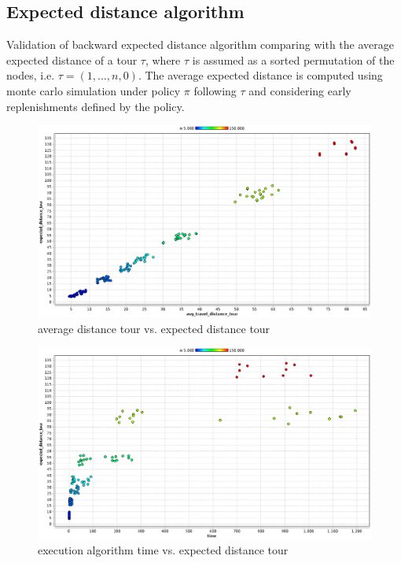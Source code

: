 \subsection{Expected distance algorithm}\label{sec:test_expecteddistance}

Validation of backward expected distance algorithm comparing with the average expected distance of a tour $\tau$, where $\tau$ is assumed as a sorted permutation of the nodes, i.e. $\tau = (1,\ldots,n,0)$. The average expected distance is computed using monte carlo simulation under policy $\pi$ following $\tau$ and considering early replenishments defined by the policy.

\begin{figure}[!htbp]
  \begin{center}
   \includegraphics[width=1\textwidth]{Images/Chapter5/avg_vs_expected_distance_tour.eps}
  \end{center}
    \caption{average distance tour vs. expected distance tour}\label{fig:avg_distance_vs_expected_distance_tour}
\end{figure}

\begin{figure}[!htbp]
  \begin{center}
   \includegraphics[width=1\textwidth]{Images/Chapter5/time_vs_expected_distance_tour.eps}
  \end{center}
    \caption{execution algorithm time vs. expected distance tour}\label{fig:time_distance_vs_expected_distance_tour}
\end{figure}